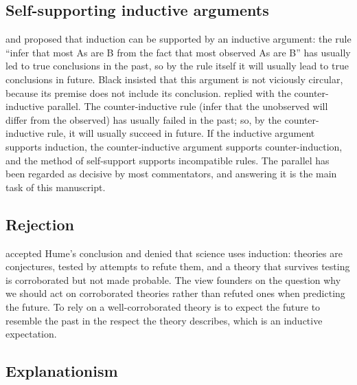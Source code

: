 \documentclass{situationist-preprint}
\begin{document}
\subsection{Self-supporting inductive arguments}

\citet{Braithwaite1953} and \citet{Black1958} proposed that induction can be supported by an inductive argument: the rule \enquote{infer that most As are B from the fact that most observed As are B} has usually led to true conclusions in the past, so by the rule itself it will usually lead to true conclusions in future. Black insisted that this argument is not viciously circular, because its premise does not include its conclusion. \citet{Salmon1957} replied with the counter-inductive parallel. The counter-inductive rule (infer that the unobserved will differ from the observed) has usually failed in the past; so, by the counter-inductive rule, it will usually succeed in future. If the inductive argument supports induction, the counter-inductive argument supports counter-induction, and the method of self-support supports incompatible rules. The parallel has been regarded as decisive by most commentators, and answering it is the main task of this manuscript.

\subsection{Rejection}

\citet{Popper1959} accepted Hume's conclusion and denied that science uses induction: theories are conjectures, tested by attempts to refute them, and a theory that survives testing is corroborated but not made probable. The view founders on the question why we should act on corroborated theories rather than refuted ones when predicting the future. To rely on a well-corroborated theory is to expect the future to resemble the past in the respect the theory describes, which is an inductive expectation.

\subsection{Explanationism}
\end{document}
